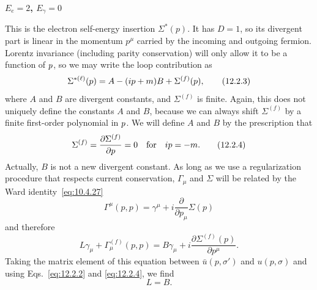 \par\noindent\textbf{$E_e=2$, $E_\gamma=0$}\par
This is the electron self-energy insertion $\Sigma^*(p)$. It has $D=1$, so
its divergent part is linear in the momentum $p^\mu$ carried by the incoming
and outgoing fermion. Lorentz invariance (including parity conservation)
will only allow it to be a function of $\sl{p}$, so we may write the loop
contribution as
\begin{equation}
  \Sigma^{*(\ell)}(p)=A-(i\sl{p}+m)B+\Sigma^{(f)}(\sl{p}),
  \tag{12.2.3}\label{eq:12.2.3}
\end{equation}
where $A$ and $B$ are divergent constants, and $\Sigma^{(f)}$ is finite.
Again, this does not uniquely define the constants $A$ and $B$, because we
can always shift $\Sigma^{(f)}$ by a finite first-order polynomial in
$\sl{p}$. We will define $A$ and $B$ by the prescription that
\begin{equation}
  \Sigma^{(f)}=\frac{\partial\Sigma^{(f)}}{\partial\sl{p}}=0
  \quad\text{for}\quad i\sl{p}=-m.
  \tag{12.2.4}\label{eq:12.2.4}
\end{equation}
Actually, $B$ is not a new divergent constant. As long as we use a
regularization procedure that respects current conservation, $\Gamma_\mu$
and $\Sigma$ will be related by the Ward identity~\eqref{eq:10.4.27}
\[
  \Gamma^\mu(p,p)=\gamma^\mu+i\frac{\partial}{\partial p_\mu}\Sigma(p)
\]
and therefore
\begin{equation}
  L\gamma_\mu+\Gamma_\mu^{(f)}(p,p)
  =B\gamma_\mu+i\frac{\partial\Sigma^{(f)}(p)}{\partial p^\mu}.
  \tag{12.2.5}\label{eq:12.2.5}
\end{equation}
Taking the matrix element of this equation between $\bar u(p,\sigma')$ and
$u(p,\sigma)$ and using Eqs.~\eqref{eq:12.2.2} and \eqref{eq:12.2.4}, we find
\begin{equation}
  L=B.
  \tag{12.2.6}\label{eq:12.2.6}
\end{equation}

